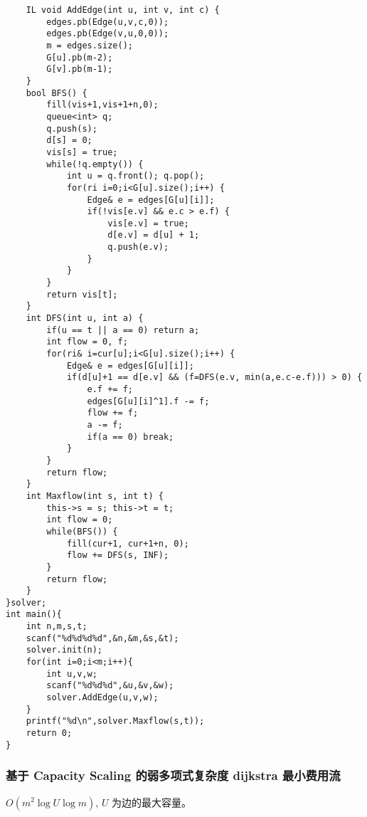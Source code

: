 \documentclass[UTF8]{ctexart}
\begin{document}
\begin{framed}
\begin{lstlisting}
    IL void AddEdge(int u, int v, int c) {
        edges.pb(Edge(u,v,c,0));
        edges.pb(Edge(v,u,0,0));
        m = edges.size();
        G[u].pb(m-2);
        G[v].pb(m-1);
    }
    bool BFS() {
        fill(vis+1,vis+1+n,0);
        queue<int> q;
        q.push(s);
        d[s] = 0;
        vis[s] = true;
        while(!q.empty()) {
            int u = q.front(); q.pop();
            for(ri i=0;i<G[u].size();i++) {
                Edge& e = edges[G[u][i]];
                if(!vis[e.v] && e.c > e.f) {
                    vis[e.v] = true;
                    d[e.v] = d[u] + 1;
                    q.push(e.v);
                }
            }
        }
        return vis[t];
    }
    int DFS(int u, int a) {
        if(u == t || a == 0) return a;
        int flow = 0, f;
        for(ri& i=cur[u];i<G[u].size();i++) {
            Edge& e = edges[G[u][i]];
            if(d[u]+1 == d[e.v] && (f=DFS(e.v, min(a,e.c-e.f))) > 0) {
                e.f += f;
                edges[G[u][i]^1].f -= f;
                flow += f;
                a -= f;
                if(a == 0) break;
            }
        }
        return flow;
    }
    int Maxflow(int s, int t) {
        this->s = s; this->t = t;
        int flow = 0;
        while(BFS()) {
            fill(cur+1, cur+1+n, 0);
            flow += DFS(s, INF);
        }
        return flow;
    }
}solver;
int main(){
    int n,m,s,t;
    scanf("%d%d%d%d",&n,&m,&s,&t);
    solver.init(n);
    for(int i=0;i<m;i++){
        int u,v,w;
        scanf("%d%d%d",&u,&v,&w);
        solver.AddEdge(u,v,w);
    }
    printf("%d\n",solver.Maxflow(s,t));
    return 0;
}
\end{lstlisting}
\end{framed}

\subsubsection{基于 Capacity Scaling 的弱多项式复杂度 dijkstra 最小费用流}

$O(m^2 \log U \log m)$, $U$ 为边的最大容量。
\end{document}
